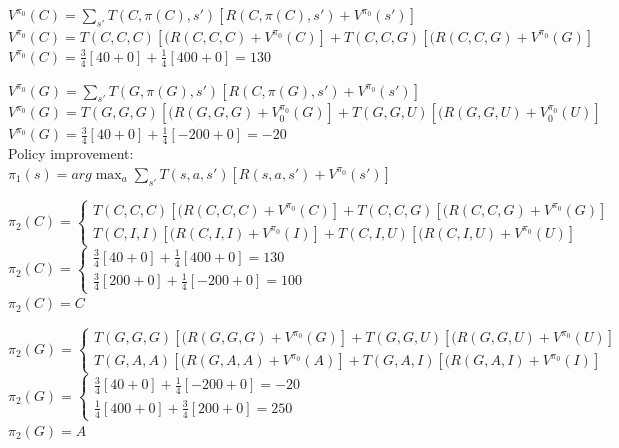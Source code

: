 \documentclass[12pt]{article}
\begin{document}
\noindent
$V^{\pi_0}(C) = \sum_{s'} T(C,\pi(C),s') [ R(C,\pi(C),s') + V^{\pi_0}(s')]$ \\
$V^{\pi_0}(C) = T(C,C,C)[(R(C,C,C)+V^{\pi_0}(C)]+T(C,C,G)[(R(C,C,G)+V^{\pi_0}(G)]$ \\
$V^{\pi_0}(C) = \frac{3}{4} [40 + 0] + \frac{1}{4} [400 + 0] = 130$

\noindent
$V^{\pi_0}(G) = \sum_{s'} T(G,\pi(G),s') [ R(C,\pi(G),s') + V^{\pi_0}(s')]$ \\
$V^{\pi_0}(G) = T(G,G,G)[(R(G,G,G)+V_0^{\pi_0}(G)]+T(G,G,U)[(R(G,G,U)+V_0^{\pi_0}(U)]$ \\
$V^{\pi_0}(G) = \frac{3}{4} [40 + 0] + \frac{1}{4} [-200 + 0] = -20$ \\

\noindent
Policy improvement: \\
$\pi_1(s) = arg \max_{a} \sum_{s'}T(s,a,s')[R(s,a,s') + V^{\pi_0}(s')]$


$\pi_2(C) =
  \begin{cases}
   T(C,C,C)[(R(C,C,C)+V^{\pi_0}(C)]+T(C,C,G)[(R(C,C,G)+V^{\pi_0}(G)] \\
   T(C,I,I)[(R(C,I,I)+V^{\pi_0}(I)]+T(C,I,U)[(R(C,I,U)+V^{\pi_0}(U)]
  \end{cases}
$ \\
$\pi_2(C) =
  \begin{cases}
    \frac{3}{4} [40 + 0] + \frac{1}{4} [400 + 0] = 130 \\
    \frac{3}{4} [200 + 0] + \frac{1}{4} [-200 + 0] = 100
  \end{cases}
$ \\
$\pi_2(C) = C$

$\pi_2(G) =
  \begin{cases}
   T(G,G,G)[(R(G,G,G)+V^{\pi_0}(G)]+T(G,G,U)[(R(G,G,U)+V^{\pi_0}(U)] \\
   T(G,A,A)[(R(G,A,A)+V^{\pi_0}(A)]+T(G,A,I)[(R(G,A,I)+V^{\pi_0}(I)]
  \end{cases}
$ \\
$\pi_2(G) =
  \begin{cases}
    \frac{3}{4} [40 + 0] + \frac{1}{4} [-200 + 0] = -20 \\
    \frac{1}{4} [400 + 0] + \frac{3}{4} [200 + 0] = 250
  \end{cases}
$ \\
$\pi_2(G) = A$
\end{document}
